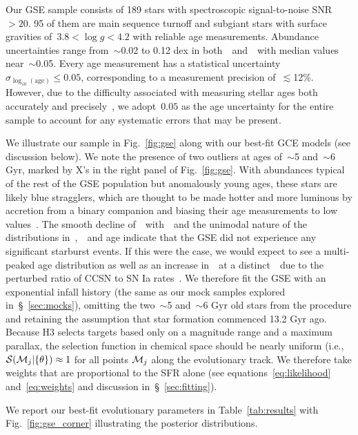 \documentclass[ms.tex]{subfiles}
\begin{document}
Our GSE sample consists of 189 stars with spectroscopic signal-to-noise
SNR~$> 20$.
95 of them are main sequence turnoff and subgiant stars with surface gravities
of~$3.8 < \log g < 4.2$ with reliable age measurements.
Abundance uncertainties range from~$\sim$0.02 to 0.12 dex in
both~\feh~and~\afe~with median values near~$\sim$0.05.
Every age measurement has a statistical uncertainty
$\sigma_{\log_{10}(\text{age})} \leq 0.05$, corresponding to a measurement
precision of~$\lesssim$12\%.
However, due to the difficulty associated with measuring stellar ages both
accurately and precisely~\citep[e.g.,][]{Soderblom2010, Chaplin2013, Angus2019},
we adopt~$0.05$ as the age uncertainty for the entire sample to account for any
systematic errors that may be present.
\par
We illustrate our sample in Fig.~\ref{fig:gse} along with our best-fit GCE
models (see discussion below).
We note the presence of two outliers at ages of~$\sim$5 and~$\sim$6 Gyr, marked
by X's in the right panel of Fig.~\ref{fig:gse}.
With abundances typical of the rest of the GSE population but anomalously young
ages, these stars are likely blue stragglers, which are thought to be made
hotter and more luminous by accretion from a binary companion and biasing their
age measurements to low values~\citep[e.g.][]{Bond1971, Stryker1993}.
The smooth decline of~\afe~with~\feh~and the unimodal nature of the
distributions in~\feh,~\afe~and age indicate that the GSE did not experience
any significant starburst events.
If this were the case, we would expect to see a multi-peaked age distribution
as well as an increase in~\afe~at a distinct~\feh~due to the perturbed ratio of
CCSN to SN Ia rates~\citep{Johnson2020}.
We therefore fit the GSE with an exponential infall history (the same as our
mock samples explored in~\S~\ref{sec:mocks}), omitting the two~$\sim$5
and~$\sim$6 Gyr old stars from the procedure and retaining the assumption that
star formation commenced 13.2 Gyr ago.
Because H3 selects targets based only on a magnitude range and a maximum
parallax, the selection function in chemical space should be nearly uniform
(i.e.,~$\mathcal{S}(\mathcal{M}_j | \{\theta\}) \approx 1$ for all points
$\mathcal{M}_j$ along the evolutionary track.
We therefore take weights that are proportional to the SFR alone (see
equations~\ref{eq:likelihood} and~\ref{eq:weights} and discussion
in~\S~\ref{sec:fitting}).
\par
We report our best-fit evolutionary parameters in Table~\ref{tab:results}
with Fig.~\ref{fig:gse_corner} illustrating the posterior distributions.
\end{document}
